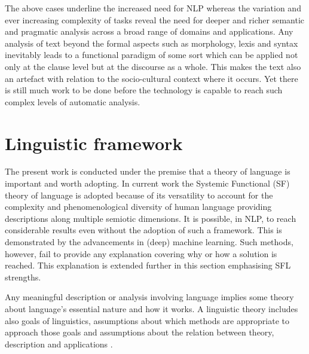     The above cases underline the increased need for NLP whereas the variation and ever increasing complexity of tasks reveal the need for deeper and richer semantic and pragmatic analysis across a broad range of domains and applications. Any analysis of text beyond the formal aspects such as morphology, lexis and syntax inevitably leads to a functional paradigm of some sort which can be applied not only at the clause level but at the discourse as a whole. This makes the text also an artefact with relation to the socio-cultural context where it occurs. Yet there is still much work to be done before the technology is capable to reach such complex levels of automatic analysis.
    
\section{Linguistic framework}
\label{sec:framework}
    The present work is conducted under the premise that a theory of language is important and worth adopting. In current work the Systemic Functional (SF) theory of language is adopted because of its versatility to account for the complexity and phenomenological diversity of human language providing descriptions along multiple semiotic dimensions. It is possible, in NLP, to reach considerable results even without the adoption of such a framework. This is demonstrated by the advancements in (deep) machine learning. Such methods, however, fail to provide any explanation covering why or how a solution is reached. This explanation is extended further in this section emphasising SFL strengths.
     
    Any meaningful description or analysis involving language implies some theory about language's essential nature and how it works. A linguistic theory includes also goals of linguistics, assumptions about which methods are appropriate to approach those goals and assumptions about the relation between theory, description and applications \citep[3]{Fawcett2000}. 
    
